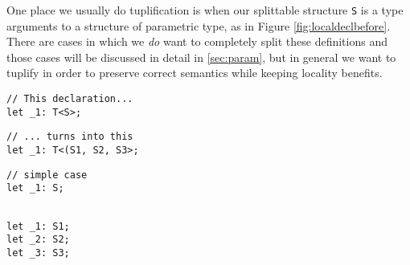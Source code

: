 \documentclass[12pt,oneside]{book}
\begin{document}
One place we usually do tuplification is when our splittable structure
\texttt{S} is a type arguments to a structure of parametric type, as in 
Figure \ref{fig:localdeclbefore}. There are cases in which we \textit{do} 
want to completely split these definitions and those cases will be discussed
in detail in \ref{sec:param}, but in general we want to tuplify in 
order to preserve correct semantics while keeping locality benefits.

\begin{figure*}
  \begin{minipage}[t]{0.5\linewidth}
\begin{verbatim}
// This declaration...
let _1: T<S>;
\end{verbatim}
  \end{minipage}
  \begin{minipage}[t]{0.5\linewidth}
\begin{verbatim}
// ... turns into this
let _1: T<(S1, S2, S3>;
\end{verbatim}
  \end{minipage}
  \caption{Simple Local Declarations Splitting $g = 3$}
  \label{fig:localdeclbefore}
\end{figure*}

\begin{figure*}
  \begin{minipage}[t]{0.5\linewidth}
\begin{verbatim}
// simple case
let _1: S;
\end{verbatim}
  \end{minipage}
  \begin{minipage}[t]{0.5\linewidth}
\begin{verbatim}

let _1: S1;
let _2: S2;
let _3: S3;

\end{verbatim}
  \end{minipage}
  
  \caption{Reference and Array Splitting $g = 3$}
  \label{fig:localdeclbefore}
\end{figure*}




\end{document}
